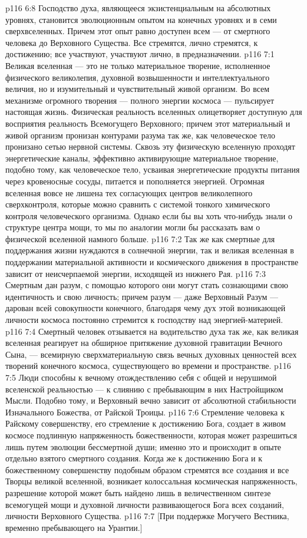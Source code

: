 \vs p116 6:8 Господство духа, являющееся экзистенциальным на абсолютных уровнях, становится эволюционным опытом на конечных уровнях и в семи сверхвселенных. Причем этот опыт равно доступен всем --- от смертного человека до Верховного Существа. Все стремятся, лично стремятся, к достижению; все участвуют, участвуют лично, в предназначении.
\vs p116 7:1 Великая вселенная --- это не только материальное творение, исполненное физического великолепия, духовной возвышенности и интеллектуального величия, но и изумительный и чувствительный живой организм. Во всем механизме огромного творения --- полного энергии космоса --- пульсирует настоящая жизнь. Физическая реальность вселенных олицетворяет доступную для восприятия реальность Всемогущего Верховного; причем этот материальный и живой организм пронизан контурами разума так же, как человеческое тело пронизано сетью нервной системы. Сквозь эту физическую вселенную проходят энергетические каналы, эффективно активирующие материальное творение, подобно тому, как человеческое тело, усваивая энергетические продукты питания через кровеносные сосуды, питается и пополняется энергией. Огромная вселенная вовсе не лишена тех согласующих центров великолепного сверхконтроля, которые можно сравнить с системой тонкого химического контроля человеческого организма. Однако если бы вы хоть что\hyp{}нибудь знали о структуре центра мощи, то мы по аналогии могли бы рассказать вам о физической вселенной намного больше.
\vs p116 7:2 Так же как смертные для поддержания жизни нуждаются в солнечной энергии, так и великая вселенная в поддержании материальной активности и космического движения в пространстве зависит от неисчерпаемой энергии, исходящей из нижнего Рая.
\vs p116 7:3 Смертным дан разум, с помощью которого они могут стать сознающими свою идентичность и свою личность; причем разум --- даже Верховный Разум --- дарован всей совокупности конечного, благодаря чему дух этой возникающей личности космоса постоянно стремится к господству над энергией\hyp{}материей.
\vs p116 7:4 Смертный человек отзывается на водительство духа так же, как великая вселенная реагирует на обширное притяжение духовной гравитации Вечного Сына, --- всемирную сверхматериальную связь вечных духовных ценностей всех творений конечного космоса, существующего во времени и пространстве.
\vs p116 7:5 Люди способны к вечному отождествлению себя с общей и нерушимой вселенской реальностью --- к слиянию с пребывающим в них Настройщиком Мысли. Подобно тому, и Верховный вечно зависит от абсолютной стабильности Изначального Божества, от Райской Троицы.
\vs p116 7:6 Стремление человека к Райскому совершенству, его стремление к достижению Бога, создает в живом космосе подлинную напряженность божественности, которая может разрешиться лишь путем эволюции бессмертной души; именно это и происходит в опыте отдельно взятого смертного создания. Когда же к достижению Бога и к божественному совершенству подобным образом стремятся все создания и все Творцы великой вселенной, возникает колоссальная космическая напряженность, разрешение которой может быть найдено лишь в величественном синтезе всемогущей мощи и духовной личности развивающегося Бога всех созданий, личности Верховного Существа.
\vsetoff
\vs p116 7:7 [При поддержке Могучего Вестника, временно пребывающего на Урантии.]
